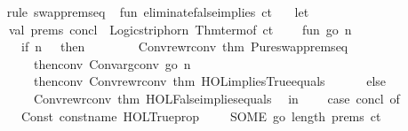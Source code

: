 \begin{isabellebody}
%
\isadelimproof
\ \ %
\endisadelimproof
%
\isatagproof
{}\isamarkupfalse%
\ {\isacharparenleft}{\kern0pt}rule\ swap{\isacharunderscore}{\kern0pt}prems{\isacharunderscore}{\kern0pt}eq{\isacharparenright}{\kern0pt}%
\endisatagproof
{\isafoldproof}%
%
\isadelimproof
\isanewline
%
\endisadelimproof
%
\isadelimML
\isanewline
%
\endisadelimML
%
\isatagML
{}\isamarkupfalse%
\ {\isacartoucheopen}\isanewline
fun\ eliminate{\isacharunderscore}{\kern0pt}false{\isacharunderscore}{\kern0pt}implies\ ct\ {\isacharequal}{\kern0pt}\isanewline
\ \ let\isanewline
\ \ \ \ val\ {\isacharparenleft}{\kern0pt}prems{\isacharcomma}{\kern0pt}\ concl{\isacharparenright}{\kern0pt}\ {\isacharequal}{\kern0pt}\ Logic{\isachardot}{\kern0pt}strip{\isacharunderscore}{\kern0pt}horn\ {\isacharparenleft}{\kern0pt}Thm{\isachardot}{\kern0pt}term{\isacharunderscore}{\kern0pt}of\ ct{\isacharparenright}{\kern0pt}\isanewline
\ \ \ \ fun\ go\ n\ {\isacharequal}{\kern0pt}\isanewline
\ \ \ \ \ \ if\ n\ {\isachargreater}{\kern0pt}\ {}\ then\isanewline
\ \ \ \ \ \ \ \ Conv{\isachardot}{\kern0pt}rewr{\isacharunderscore}{\kern0pt}conv\ {\isacharat}{\kern0pt}{\isacharbraceleft}{\kern0pt}thm\ Pure{\isachardot}{\kern0pt}swap{\isacharunderscore}{\kern0pt}prems{\isacharunderscore}{\kern0pt}eq{\isacharbraceright}{\kern0pt}\isanewline
\ \ \ \ \ \ \ \ then{\isacharunderscore}{\kern0pt}conv\ Conv{\isachardot}{\kern0pt}arg{\isacharunderscore}{\kern0pt}conv\ {\isacharparenleft}{\kern0pt}go\ {\isacharparenleft}{\kern0pt}n\ {\isacharminus}{\kern0pt}\ {}{\isacharparenright}{\kern0pt}{\isacharparenright}{\kern0pt}\isanewline
\ \ \ \ \ \ \ \ then{\isacharunderscore}{\kern0pt}conv\ Conv{\isachardot}{\kern0pt}rewr{\isacharunderscore}{\kern0pt}conv\ {\isacharat}{\kern0pt}{\isacharbraceleft}{\kern0pt}thm\ HOL{\isachardot}{\kern0pt}implies{\isacharunderscore}{\kern0pt}True{\isacharunderscore}{\kern0pt}equals{\isacharbraceright}{\kern0pt}\isanewline
\ \ \ \ \ \ else\isanewline
\ \ \ \ \ \ \ \ Conv{\isachardot}{\kern0pt}rewr{\isacharunderscore}{\kern0pt}conv\ {\isacharat}{\kern0pt}{\isacharbraceleft}{\kern0pt}thm\ HOL{\isachardot}{\kern0pt}False{\isacharunderscore}{\kern0pt}implies{\isacharunderscore}{\kern0pt}equals{\isacharbraceright}{\kern0pt}\isanewline
\ \ in\isanewline
\ \ \ \ case\ concl\ of\isanewline
\ \ \ \ \ \ Const\ {\isacharparenleft}{\kern0pt}{\isacharat}{\kern0pt}{\isacharbraceleft}{\kern0pt}const{\isacharunderscore}{\kern0pt}name\ HOL{\isachardot}{\kern0pt}Trueprop{\isacharbraceright}{\kern0pt}{\isacharcomma}{\kern0pt}\ {\isacharunderscore}{\kern0pt}{\isacharparenright}{\kern0pt}\ {\isachardollar}{\kern0pt}\ {\isacharunderscore}{\kern0pt}\ {\isacharequal}{\kern0pt}{\isachargreater}{\kern0pt}\ SOME\ {\isacharparenleft}{\kern0pt}go\ {\isacharparenleft}{\kern0pt}length\ prems{\isacharparenright}{\kern0pt}\ ct{\isacharparenright}{\kern0pt}\isanewline

\end{isabellebody}
